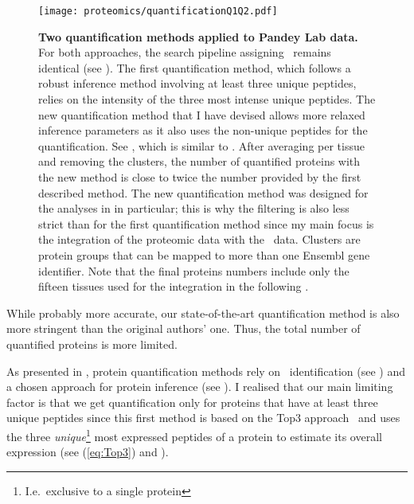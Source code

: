\begin{figure}[!htbp]
    \texttt{[image: proteomics/quantificationQ1Q2.pdf]}\centering
    \caption[Two quantification methods for Pandey Lab data]{\label{fig:newQuantProtMeth}\textbf{Two
    quantification methods applied to Pandey Lab data.}
    For both approaches, the search pipeline assigning \psms\ remains identical
    (see ).
    The first quantification method,
    which follows a robust inference method
    involving at least three unique peptides,
    relies on the intensity of the three most intense unique peptides.
    The new quantification method that I have devised
    allows more relaxed inference parameters
    as it also uses the non-unique peptides for the quantification.
    See ,
    which is similar to .
    After averaging per tissue and removing the clusters,
    the number of quantified proteins with the new method
    is close to twice the number provided by the first described method.
    The new quantification method was designed
    for the analyses in  in particular;
    this is why the filtering is also less strict than for the first quantification method
    since my main focus is the integration of the proteomic data
    with the \Rnaseq\ data.
    Clusters are protein groups that can be mapped to
    more than one \gls{Ensembl} gene identifier.
    Note that the final proteins numbers include only the fifteen tissues
    used for the integration in the following .
    }
\end{figure}

While probably more accurate,
our state-of-the-art quantification method is also
more stringent than the original authors' one.
Thus, the total number of quantified proteins is more limited.\mybr\

As presented in ,
protein quantification methods rely on
\psms\ identification (see )
and a chosen approach for protein inference (see ).
I realised that our main limiting factor is that
we get quantification only for proteins
that have at least three unique peptides
since this first method is based on the Top3 approach~
and uses the three \emph{unique}\footnote{I.e.\ exclusive to a single protein}
most expressed peptides of a protein to estimate its overall expression
(see  (\vref{eq:Top3}) and ).\mybr\


